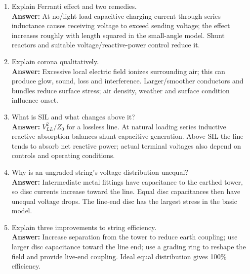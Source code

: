 \documentclass[11pt,a4paper]{article}
\begin{document}
\begin{enumerate}
\item Explain Ferranti effect and two remedies.\\
\textbf{Answer:} At no/light load capacitive charging current through series inductance causes receiving voltage to exceed sending voltage; the effect increases roughly with length squared in the small-angle model. Shunt reactors and suitable voltage/reactive-power control reduce it.
\item Explain corona qualitatively.\\
\textbf{Answer:} Excessive local electric field ionizes surrounding air; this can produce glow, sound, loss and interference. Larger/smoother conductors and bundles reduce surface stress; air density, weather and surface condition influence onset.
\item What is SIL and what changes above it?\\
\textbf{Answer:} $V_{LL}^2/Z_0$ for a lossless line. At natural loading series inductive reactive absorption balances shunt capacitive generation. Above SIL the line tends to absorb net reactive power; actual terminal voltages also depend on controls and operating conditions.
\item Why is an ungraded string's voltage distribution unequal?\\
\textbf{Answer:} Intermediate metal fittings have capacitance to the earthed tower, so disc currents increase toward the line. Equal disc capacitances then have unequal voltage drops. The line-end disc has the largest stress in the basic model.
\item Explain three improvements to string efficiency.\\
\textbf{Answer:} Increase separation from the tower to reduce earth coupling; use larger disc capacitance toward the line end; use a grading ring to reshape the field and provide live-end coupling. Ideal equal distribution gives 100\% efficiency.
\end{enumerate}
\end{document}
